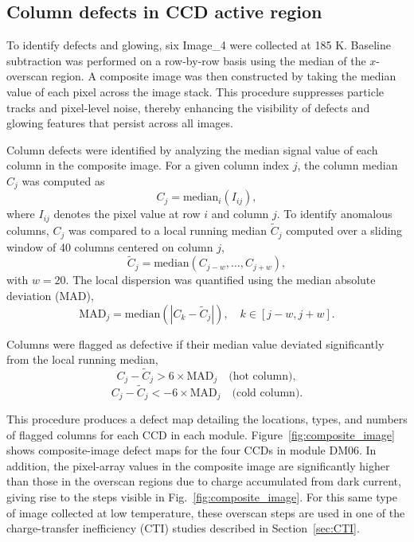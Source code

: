 \documentclass[11pt]{article}
\begin{document}
\subsection{Column defects in CCD active region}
\label{sec:column_defects}
To identify defects and glowing, six Image\_4 were collected at 185 K. Baseline subtraction was performed on a row-by-row basis using the median of the $x$-overscan region. A composite image was then constructed by taking the median value of each pixel across the image stack. This procedure suppresses particle tracks and pixel-level noise, thereby enhancing the visibility of defects and glowing features that persist across all images.

Column defects were identified by analyzing the median signal value of each column in the composite image. For a given column index $j$, the column median $C_j$ was computed as
\begin{equation}
C_j = \mathrm{median}_{i}\left( I_{ij} \right),
\end{equation}
where $I_{ij}$ denotes the pixel value at row $i$ and column $j$.
To identify anomalous columns, $C_j$ was compared to a local running median $\tilde{C}_j$ computed over a sliding window of 40 columns centered on column $j$,
\begin{equation}
\tilde{C}_j = \mathrm{median}\left( C_{j-w}, \ldots, C_{j+w} \right),
\end{equation}
with $w=20$. The local dispersion was quantified using the median absolute deviation (MAD),
\begin{equation}
\mathrm{MAD}_j = \mathrm{median}\left( \left| C_k - \tilde{C}_j \right| \right), \quad k \in [j-w, j+w].
\end{equation}

Columns were flagged as defective if their median value deviated significantly from the local running median,
\begin{equation}
C_j - \tilde{C}_j > 6 \times \mathrm{MAD}_j \quad \text{(hot column)},
\end{equation}
\begin{equation}
C_j - \tilde{C}_j < -6 \times \mathrm{MAD}_j \quad \text{(cold column)}.
\end{equation}

This procedure produces a defect map detailing the locations, types, and numbers of flagged columns for each CCD in each module. Figure~\ref{fig:composite_image} shows composite-image defect maps for the four CCDs in module DM06. In addition, the pixel-array values in the composite image are significantly higher than those in the overscan regions due to charge accumulated from dark current, giving rise to the steps visible in Fig.~\ref{fig:composite_image}. For this same type of image collected at low temperature, these overscan steps are used in one of the charge-transfer inefficiency (CTI) studies described in Section~\ref{sec:CTI}.
\end{document}
